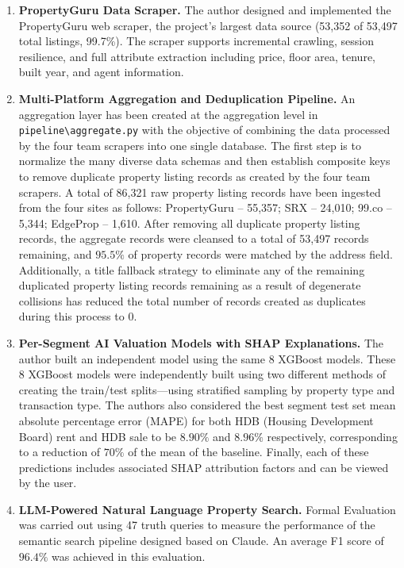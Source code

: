 \begin{enumerate}
    \item \textbf{PropertyGuru Data Scraper.}
    The author designed and implemented the PropertyGuru web scraper, the project's largest
    data source (53,352 of 53,497 total listings, 99.7\%). The scraper supports incremental
    crawling, session resilience, and full attribute extraction including price, floor area,
    tenure, built year, and agent information.

    \item \textbf{Multi-Platform Aggregation and Deduplication Pipeline.}
    An aggregation layer has been created at the aggregation level in 
    \texttt{pipeline\textbackslash aggregate.py} with the objective of combining 
    the data processed by the four team scrapers into one single database. The 
    first step is to normalize the many diverse data schemas and then establish 
    composite keys to remove duplicate property listing records as created by the 
    four team scrapers. A total of 86,321 raw property listing records have been 
    ingested from the four sites as follows: PropertyGuru -- 55,357; SRX -- 24,010; 
    99.co -- 5,344; EdgeProp -- 1,610. After removing all duplicate property 
    listing records, the aggregate records were cleansed to a total of 53,497 
    records remaining, and $95.5\%$ of property records were matched by the 
    address field. Additionally, a title fallback strategy to eliminate any of the 
    remaining duplicated property listing records remaining as a result of 
    degenerate collisions has reduced the total number of records created as 
    duplicates during this process to 0.

    \item \textbf{Per-Segment AI Valuation Models with SHAP Explanations.}
    The author built an independent model using the same 8 XGBoost models. These 8 
    XGBoost models were independently built using two different methods of 
    creating the train/test splits---using stratified sampling by property type 
    and transaction type. The authors also considered the best segment test set 
    mean absolute percentage error (MAPE) for both HDB (Housing Development Board) 
    rent and HDB sale to be $8.90\%$ and $8.96\%$ respectively, corresponding to a 
    reduction of $70\%$ of the mean of the baseline. Finally, each of these 
    predictions includes associated SHAP attribution factors and can be viewed by 
    the user.

    \item \textbf{LLM-Powered Natural Language Property Search.}
    Formal Evaluation was carried out using 47 truth queries to measure the 
    performance of the semantic search pipeline designed based on Claude. An 
    average F1 score of $96.4\%$ was achieved in this evaluation.


\end{enumerate}
